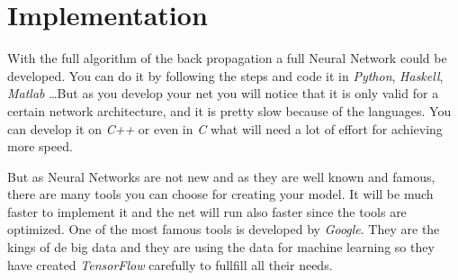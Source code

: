 \section{Implementation}
With the full algorithm of the back propagation a full Neural Network could be developed. You can do it by following the steps and code it in \textit{Python}, \textit{Haskell}, \textit{Matlab} \dots But as you develop your net you will notice that it is only valid for a certain network architecture, and it is pretty slow because of the languages. You can develop it on \textit{C++} or even in \textit{C} what will need a lot of effort for achieving more speed.

But as Neural Networks are not new and as they are well known and famous, there are many tools you can choose for creating your model. It will be much faster to implement it and the net will run also faster since the tools are optimized. One of the most famous tools is developed by \textit{Google}. They are the kings of de big data and they are using the data for machine learning so they have created \textit{TensorFlow} carefully to fullfill all their needs.
